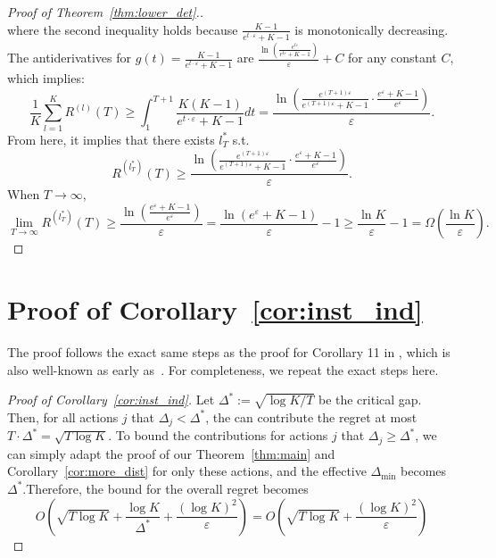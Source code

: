 \begin{proof}[Proof of Theorem~\ref{thm:lower_det}.]
$$	$$
	where the second inequality holds because $\frac{K-1}{e^{t\cdot \varepsilon} + K-1}$ is monotonically decreasing.
	The antiderivatives for $g(t)=\frac{K-1}{e^{t\cdot \varepsilon} + K-1}$ are $\frac{\ln\left(\frac{e^{t\varepsilon}}{e^{t\varepsilon} + K - 1}\right)}{\varepsilon} + C$ for any constant $C$, which implies:
	$$
	\frac{1}{K}\sum_{l=1}^KR^{(l)}(T)\geq \int_{1}^{T+1}\frac{K (K-1)}{e^{t\cdot \varepsilon} + K-1}dt = \frac{\ln\left(\frac{e^{(T+1)\varepsilon}}{e^{(T+1)\varepsilon} + K - 1}\cdot \frac{e^{\varepsilon} + K - 1}{e^{\varepsilon}}\right)}{\varepsilon}.
	$$
	From here, it implies that there exists $l_T^*$ s.t. 
	$$
	R^{(l_T^*)}(T)\geq \frac{\ln\left(\frac{e^{(T+1)\varepsilon}}{e^{(T+1)\varepsilon} + K - 1}\cdot \frac{e^{\varepsilon} + K - 1}{e^{\varepsilon}}\right)}{\varepsilon}.
	$$
	When $T\to\infty$,
	$$
	\lim_{T\to\infty}R^{(l_T^*)}(T)\geq \frac{\ln\left(\frac{e^{\varepsilon} + K - 1}{e^{\varepsilon}}\right)}{\varepsilon} = \frac{\ln\left(e^{\varepsilon} + K - 1\right) }{\varepsilon} - 1 \geq \frac{\ln K  }{\varepsilon} - 1 = \Omega\left(\frac{\ln K  }{\varepsilon}\right).
	$$
	\end{proof}

\section{Proof of Corollary~\ref{cor:inst_ind}}
\label{sec:app_proof_inst_ind}
The proof follows the exact same steps as the proof for Corollary 11 in \citet{hu2021near}, which is also well-known as early as~\citet{audibert2009minimax}.
For completeness, we repeat the exact steps here.
\begin{proof}[Proof of Corollary~\ref{cor:inst_ind}]
	Let $\Delta^*:=\sqrt{\log K/T}$ be the critical gap. Then, for all actions $j$ that $\Delta_j<\Delta^*$, the can contribute the regret at most $T\cdot \Delta^*=\sqrt{T\log K}$.
	 To bound the contributions for actions $j$ that $\Delta_j\geq \Delta^*$, we can simply adapt the proof of our Theorem~\ref{thm:main} and Corollary~\ref{cor:more_dist} for only these actions, and the effective $\Delta_{\min}$ becomes $\Delta^*$.Therefore, the  bound for the overall regret becomes 
	 $$
	 O\left(\sqrt{T\log K} + \frac{\log K}{\Delta^*} + \frac{(\log K)^2}{\varepsilon}\right) = O\left(\sqrt{T\log K} + \frac{(\log K)^2}{\varepsilon}\right)
	 $$
\end{proof}


